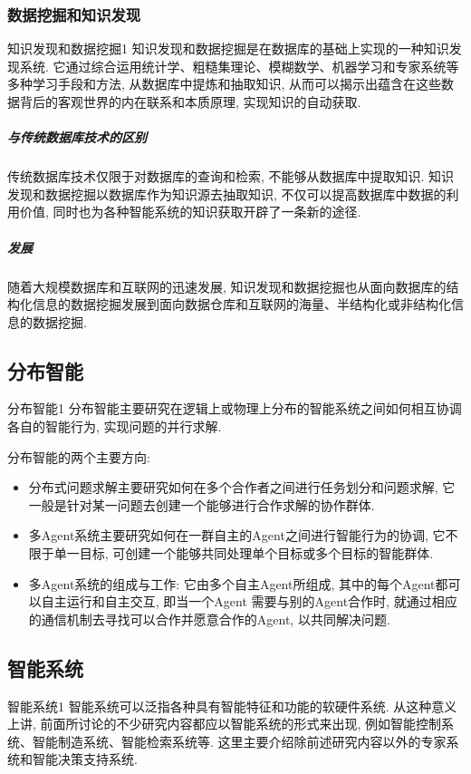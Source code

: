 \subsubsection{数据挖掘和知识发现}

\begin{mydef}{知识发现和数据挖掘}{1}
知识发现和数据挖掘是在数据库的基础上实现的一种知识发现系统. 它通过综合运用统计学、粗糙集理论、模糊数学、机器学习和专家系统等多种学习手段和方法, 从数据库中提炼和抽取知识, 从而可以揭示出蕴含在这些数据背后的客观世界的内在联系和本质原理, 实现知识的自动获取.
\end{mydef}

\subparagraph{与传统数据库技术的区别}
传统数据库技术仅限于对数据库的查询和检索, 不能够从数据库中提取知识. 知识发现和数据挖掘以数据库作为知识源去抽取知识, 不仅可以提高数据库中数据的利用价值, 同时也为各种智能系统的知识获取开辟了一条新的途径.
\subparagraph{发展}
随着大规模数据库和互联网的迅速发展, 知识发现和数据挖掘也从面向数据库的结构化信息的数据挖掘发展到面向数据仓库和互联网的海量、半结构化或非结构化信息的数据挖掘.
\subsection{分布智能}

\begin{mydef}{分布智能}{1}
分布智能主要研究在逻辑上或物理上分布的智能系统之间如何相互协调各自的智能行为, 实现问题的并行求解.
\end{mydef}
分布智能的两个主要方向:
\begin{itemize}
\item 分布式问题求解主要研究如何在多个合作者之间进行任务划分和问题求解, 它一般是针对某一问题去创建一个能够进行合作求解的协作群体.
\item 多Agent系统主要研究如何在一群自主的Agent之间进行智能行为的协调, 它不限于单一目标, 可创建一个能够共同处理单个目标或多个目标的智能群体.
\item 多Agent系统的组成与工作: 它由多个自主Agent所组成, 其中的每个Agent都可以自主运行和自主交互, 即当一个Agent 需要与别的Agent合作时, 就通过相应的通信机制去寻找可以合作并愿意合作的Agent, 以共同解决问题.
\end{itemize}
\subsection{智能系统}
\begin{mydef}{智能系统}{1}
智能系统可以泛指各种具有智能特征和功能的软硬件系统. 从这种意义上讲, 前面所讨论的不少研究内容都应以智能系统的形式来出现, 例如智能控制系统、智能制造系统、智能检索系统等. 这里主要介绍除前述研究内容以外的专家系统和智能决策支持系统.
\end{mydef}
